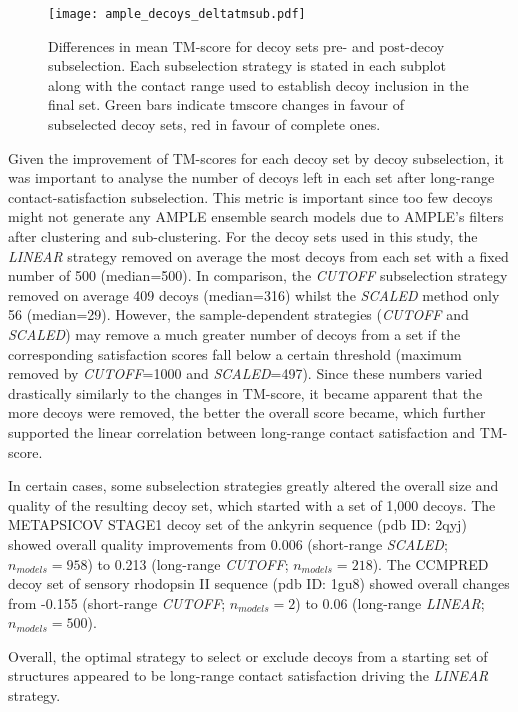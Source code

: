 \begin{figure}[H]
	\centering
	\texttt{[image: ample\_decoys\_deltatmsub.pdf]}
        \caption[TM-score comparison pre- and post-decoy subselection]{Differences in mean TM-score  for decoy sets pre- and post-decoy subselection. Each subselection strategy is stated in each subplot along with the contact range used to establish decoy inclusion in the final set. Green bars indicate \gls{tmscore} changes in favour of subselected decoy sets, red in favour of complete ones.}
	\label{fig:ample_decoys_deltatmsub}
\end{figure}

Given the improvement of TM-scores for each decoy set by decoy subselection, it was important to analyse the number of decoys left in each set after long-range contact-satisfaction subselection. This metric is important since too few decoys might not generate any AMPLE ensemble search models due to AMPLE's filters after clustering and sub-clustering. For the decoy sets used in this study, the \textit{LINEAR} strategy removed on average the most decoys from each set with a fixed number of 500 (median=500). In comparison, the \textit{CUTOFF} subselection strategy removed on average 409 decoys (median=316) whilst the \textit{SCALED} method only 56 (median=29). However, the sample-dependent strategies (\textit{CUTOFF} and \textit{SCALED}) may remove a much greater number of decoys from a set if the corresponding satisfaction scores fall below a certain threshold (maximum removed by \textit{CUTOFF}=1000 and \textit{SCALED}=497). Since these numbers varied drastically similarly to the changes in TM-score, it became apparent that the more decoys were removed, the better the overall score became, which further supported the linear correlation between long-range contact satisfaction and TM-score.

In certain cases, some subselection strategies greatly altered the overall size and quality of the resulting decoy set, which started with a set of 1,000 decoys. The METAPSICOV STAGE1 decoy set of the ankyrin sequence (\gls{pdb} ID: 2qyj) showed overall quality improvements from 0.006 (short-range \textit{SCALED}; $n_{models}=958$) to 0.213 (long-range \textit{CUTOFF}; $n_{models}=218$). The CCMPRED decoy set of sensory rhodopsin II sequence (\gls{pdb} ID: 1gu8) showed overall changes from -0.155 (short-range \textit{CUTOFF}; $n_{models}=2$) to 0.06 (long-range \textit{LINEAR}; $n_{models}=500$).

Overall, the optimal strategy to select or exclude decoys from a starting set of structures appeared to be long-range contact satisfaction driving the \textit{LINEAR} strategy.

